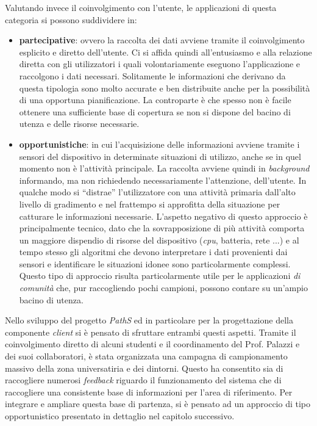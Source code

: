 Valutando invece il coinvolgimento con l'utente, le applicazioni di questa categoria si possono suddividere in:
\begin{itemize}
  \item \textbf{partecipative}: ovvero la raccolta dei dati avviene tramite il coinvolgimento esplicito e diretto dell'utente. Ci si affida quindi all'entusiasmo e alla relazione diretta con gli utilizzatori i quali volontariamente eseguono l'applicazione e raccolgono i dati necessari. Solitamente le informazioni che derivano da questa tipologia sono molto accurate e ben distribuite anche per la possibilità di una opportuna pianificazione. La controparte è che spesso non è facile ottenere una sufficiente base di copertura se non si dispone del bacino di utenza e delle risorse necessarie. 
  \item \textbf{opportunistiche}: in cui l'acquisizione delle informazioni avviene tramite i sensori del dispositivo in determinate situazioni di utilizzo, anche se in quel momento non è l'attività principale. La raccolta avviene quindi in \emph{background} informando, ma non richiedendo necessariamente l'attenzione, dell'utente. In qualche modo si ``distrae'' l'utilizzatore con una attività primaria dall'alto livello di gradimento e nel frattempo si approfitta della situazione per catturare le informazioni necessarie. L'aspetto negativo di questo approccio è principalmente tecnico, dato che la sovrapposizione di più attività comporta un maggiore dispendio di risorse del dispositivo (\emph{cpu}, batteria, rete ...) e al tempo stesso gli algoritmi che devono interpretare i dati provenienti dai sensori e identificare le situazioni idonee sono particolarmente complessi. Questo tipo di approccio risulta particolarmente utile per le applicazioni \emph{di comunità} che, pur raccogliendo pochi campioni, possono contare su un'ampio bacino di utenza.
\end{itemize}
Nello sviluppo del progetto \emph{PathS} ed in particolare per la progettazione della componente \emph{client} si è pensato di sfruttare entrambi questi aspetti. Tramite il coinvolgimento diretto di alcuni studenti e il coordinamento del Prof. Palazzi e dei suoi collaboratori, è stata organizzata una campagna di campionamento massivo della zona universatiria e dei dintorni. Questo ha consentito sia di raccogliere numerosi \emph{feedback} riguardo il funzionamento del sistema che di raccogliere una consistente base di informazioni per l'area di riferimento. Per integrare e ampliare questa base di partenza, si è pensato ad un approccio di tipo opportunistico presentato in dettaglio nel capitolo successivo.

